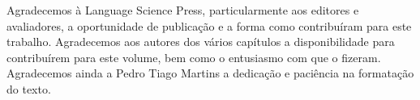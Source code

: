 Agradecemos à Language Science Press, particularmente aos editores e avaliadores, a oportunidade de publicação e a forma como contribuíram para este trabalho. Agradecemos aos autores dos vários capítulos a disponibilidade para contribuírem para este volume, bem como o entusiasmo com que o fizeram. Agradecemos ainda a Pedro Tiago Martins a dedicação e paciência na formatação do texto.
